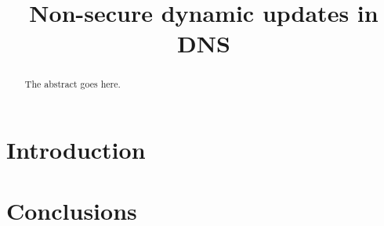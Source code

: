 \documentclass[sigconf]{acmart}
\begin{document}
\title{Non-secure dynamic updates in DNS}

\date{}


\maketitle



\begin{abstract}
The abstract goes here.
\end{abstract}

\section{Introduction}

















\section{Conclusions}


 
\end{document}

